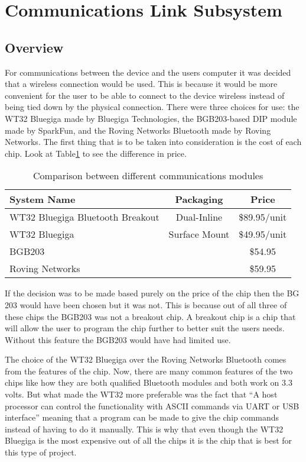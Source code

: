 \section[Wireless Link]{Communications Link Subsystem}
\subsection{Overview}
For communications between the device and the users computer it was decided 
that a wireless connection would be used.  This is because it would be more 
convenient for the user to be able to connect to the device wireless instead of
 being tied down by the physical connection.  There were three choices for use:
 the WT32 Bluegiga made by Bluegiga Technologies, the BGB203-based DIP module made by SparkFun, 
and the Roving Networks Bluetooth \textregistered made by Roving Networks.  The first thing 
that is to be taken into consideration is the cost of each chip. Look at 
Table\ref{tab:bt_prices} to see the difference in price.

\begin{table}[hbp]
\caption{Comparison between different communications modules \cite{web:wt32-price}\cite{web:bg203-price}\cite{web:roving-price}}
\begin{tabular}{l | c c } 
	System Name & Packaging & Price \\\hline
	WT32 Bluegiga Bluetooth \textregistered Breakout & Dual-Inline & \$89.95/unit \\
	WT32 Bluegiga & Surface Mount & \$49.95/unit \\
	BGB203 & & \$54.95 \\
	Roving Networks & & \$59.95
\end{tabular}
\label{tab:bt_prices}
\end{table}

If the decision was to be made based purely on the price of the chip then the 
BG 203 would have been chosen but it was not.  This is because out of all three
 of these chips the BGB203 was not a breakout chip.  A breakout chip is a chip 
that will allow the user to program the chip further to better suit the users 
needs.  Without this feature the BGB203 would have had limited use.

The choice of the WT32 Bluegiga over the Roving Networks Bluetooth \textregistered comes from 
the features of the chip.  Now, there are many common features of the two chips
 like how they are both qualified Bluetooth \textregistered modules and both work on 3.3 volts.
  But what made the WT32 more preferable was the fact that ``A host processor 
can control the functionality with ASCII commands via UART or USB 
interface'' meaning that a program can be made to give the chip commands 
instead of having to do it manually\cite{web:wt32-price}.  This is why that 
even though the WT32 Bluegiga is the most expensive out of all the chips it is 
the chip that is best for this type of project. 

